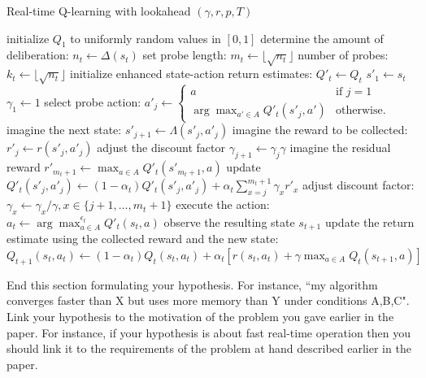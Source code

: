 \documentclass[letterpaper]{article}
\numberwithin{equation}{section}
\numberwithin{theorem}{section}
\numberwithin{lemma}{section}
\numberwithin{df}{section}
\begin{document}
\begin{algorithm*}[t]
\DontPrintSemicolon
\label{alg:fAlg}
\caption{Real-time Q-learning with lookahead $(\gamma, r, p, T)$}

initialize $Q_1$ to uniformly random values in $[0,1]$\;
{
determine the amount of deliberation: $n_t \leftarrow \Delta(s_t)$ \; \label{al:amountOfDeliberation}
set probe length: $m_t \leftarrow \lfloor \sqrt{n_t} \rfloor$ \; \label{al:probeLength}
number of probes: $k_t \leftarrow \lfloor \sqrt{n_t} \rfloor$ \; \label{al:probeNumber}
%
initialize enhanced state-action return estimates: $Q'_t \leftarrow Q_t$ \;
%
{
%
{
$s'_1 \leftarrow s_t$ \;\label{al:firstState}
$\gamma_1 \leftarrow 1$ \;
%
{
select probe action: $a'_j \leftarrow \begin{cases}
a & \text{if $j=1$} \\
\arg \max_{a' \in A} Q'_t(s'_j,a') & \text{otherwise.}
\end{cases}$ \; \label{al:selectProbeAction}
imagine the next state: $s'_{j+1} \leftarrow \Lambda(s'_j,a'_j)$ \;\label{al:applyProbeAction}
imagine the reward to be collected: $r'_j \leftarrow r(s'_j,a'_j)$ \;\label{al:collectProbeReward}
adjust the discount factor $\gamma_{j+1} \leftarrow \gamma_j \gamma$ \;
}
imagine the residual reward $r'_{m_t+1} \leftarrow \max_{a \in A} Q'_t(s'_{m_t+1},a)$ \;\label{al:residualReward}
%
{
update $Q'_t(s'_j,a'_j) \leftarrow (1-\alpha_t) Q'_t(s'_j,a'_j) + \alpha_t
\sum_{x = j}^{{m_t}+1} \gamma_x r'_x$ \;\label{al:learningProbe}
adjust discount factor: $\gamma_x \leftarrow \gamma_x / \gamma, x \in \{j+1,\dots,m_t+1\}$\;
}
}
}
execute the action: $a_t \leftarrow \arg \max^{\epsilon_t}_{a \in A} Q'_t(s_t,a)$ \;\label{al:actionSelect}\label{al:actionExecute}
observe the resulting state $s_{t+1}$ \;
%
update the return estimate using the collected reward and the new state: $Q_{t+1}(s_t,a_t) \leftarrow (1-\alpha_t) Q_t(s_t,a_t) + \alpha_t \left[ r(s_t,a_t) + \gamma \max_{a \in A} Q_t(s_{t+1},a) \right]$ \; \label{al:learningQ}
}
\end{algorithm*}

End this section formulating your hypothesis. For instance, ``my algorithm converges faster than X but uses more memory than Y under conditions A,B,C". Link your hypothesis to the motivation of the problem you gave earlier in the paper. For instance, if your hypothesis is about fast real-time operation then you should link it to the requirements of the problem at hand described earlier in the paper.
\end{document}
